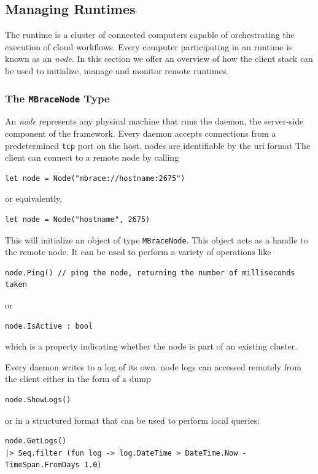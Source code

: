 \subsection{Managing \TitularMbrace{} Runtimes}

The \mbrace{} runtime is a cluster of connected computers capable of orchestrating the execution
of cloud workflows. Every computer participating in an \mbrace{} runtime is known as an \mbrace{}
\emph{node}. In this section we offer an overview of how the \mbrace{} client stack can be
used to initialize, manage and monitor remote \mbrace{} runtimes.

\subsubsection*{The \texttt{MBraceNode} Type}

An \mbrace{} \emph{node} represents any physical machine that runs the \emph{\mbrace{}} daemon, 
the server-side component of the framework. Every \mbrace{} daemon accepts connections from a predetermined 
\texttt{tcp} port on the host. \Mbrace{} nodes are identifiable by the uri format
The \mbrace{} client can connect to a remote node by calling
\begin{lstlisting}
let node = Node("mbrace://hostname:2675")
\end{lstlisting}
or equivalently,
\begin{lstlisting}
let node = Node("hostname", 2675)
\end{lstlisting}
This will initialize an object of type \texttt{MBraceNode}. This object acts as a handle
to the remote node. It can be used to perform a variety of operations like
\begin{lstlisting}
node.Ping() // ping the node, returning the number of milliseconds taken
\end{lstlisting}
or
\begin{lstlisting}
node.IsActive : bool
\end{lstlisting}
which is a property indicating whether the node is part of an existing \mbrace{} cluster.

Every \mbrace{} daemon writes to a log of its own. \Mbrace{} node logs can accessed remotely
from the client either in the form of a dump
\begin{lstlisting}
node.ShowLogs()
\end{lstlisting}
or in a structured format that can be used to perform local queries:
\begin{lstlisting}
node.GetLogs() 
|> Seq.filter (fun log -> log.DateTime > DateTime.Now - TimeSpan.FromDays 1.0)
\end{lstlisting}

